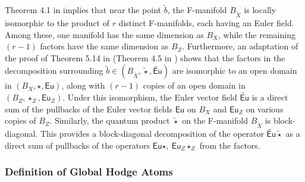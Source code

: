 \documentclass[12pt,a4paper]{amsart}
\theoremstyle{definition}
\theoremstyle{remark}
\begin{document}
Theorem 4.1 in \cite{katzarkovpantevyu} implies that near the point $\widetilde b$, the F-manifold $B_{\widetilde X}$ is locally isomorphic to the product of $r$ distinct F-manifolds, each having an Euler field. Among these, one manifold has the same dimension as $B_X$, while the remaining $(r-1)$ factors have the same dimension as $B_Z$. Furthermore, an adaptation of the proof of Theorem 5.14 in \cite{iritani2023quantumcohomologyblowups} (Theorem 4.5 in \cite{katzarkovpantevyu}) shows that the factors in the decomposition surrounding $\widetilde b \in (B_{\widetilde X}, \widetilde \star, \widetilde{\mathsf{Eu}})$ are isomorphic to an open domain in $(B_X, \star, \mathsf{Eu})$, along with $(r-1)$ copies of an open domain in $(B_Z, \star_Z, \mathsf{Eu}_Z)$. Under this isomorphism, the Euler vector field $\widetilde{\mathsf{Eu}}$ is a direct sum of the pullbacks of the Euler vector fields $\mathsf{Eu}$ on $B_X$ and $\mathsf{Eu}_Z$ on various copies of $B_Z$. Similarly, the quantum product $\widetilde\star$ on the F-manifold $B_{\widetilde X}$ is block-diagonal. This provides a block-diagonal decomposition of the operator $\widetilde{\mathsf{Eu}}\widetilde{\star}$ as a direct sum of pullbacks of the operators $\mathsf{Eu}\star,~\mathsf{Eu}_Z\star_Z$ from the factors. 

\subsubsection{Definition of Global Hodge Atoms}
\label{subsec:global-hodge-atoms-def}
\end{document}
